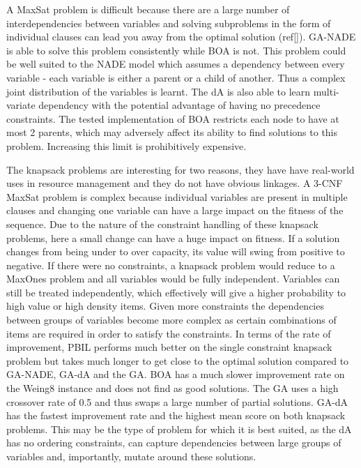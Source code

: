 \documentclass[twoside]{article}
\begin{document}
A MaxSat problem is difficult because there are a large number of interdependencies between variables and solving subproblems in the form of individual clauses can lead you away from the optimal solution (ref\ref{}). GA-NADE is able to solve this problem consistently while BOA is not. This problem could be well suited to the NADE model which assumes a dependency between every variable - each variable is either a parent or a child of another. Thus a complex joint distribution of the variables is learnt. The dA is also able to learn multi-variate dependency with the potential advantage of having no precedence constraints. The tested implementation of BOA restricts each node to have at most 2 parents, which may adversely affect its ability to find solutions to this problem. Increasing this limit is prohibitively expensive.

The knapsack problems are interesting for two reasons, they have have real-world uses in resource management and they do not have obvious linkages. A 3-CNF MaxSat problem is complex because individual variables are present in multiple clauses and changing one variable can have a large impact on the fitness of the sequence. Due to the nature of the constraint handling of these knapsack problems, here a small change can have a huge impact on fitness. If a solution changes from being under to over capacity, its value will swing from positive to negative. If there were no constraints, a knapsack problem would reduce to a MaxOnes problem and all variables would be fully independent. Variables can still be treated independently, which effectively will give a higher probability to high value or high density items. Given more constraints the dependencies between groups of variables become more complex as certain combinations of items are required in order to satisfy the constraints. In terms of the rate of improvement, PBIL performs much better on the single constraint knapsack problem but takes much longer to get close to the optimal solution compared to GA-NADE, GA-dA and the GA. BOA has a much slower improvement rate on the Weing8 instance and does not find as good solutions. The GA uses a high crossover rate of 0.5 and thus swaps a large number of partial solutions. GA-dA has the fastest improvement rate and the highest mean score on both knapsack problems. This may be the type of problem for which it is best suited, as the dA has no ordering constraints, can capture dependencies between large groups of variables and, importantly, mutate around these solutions.
\end{document}
